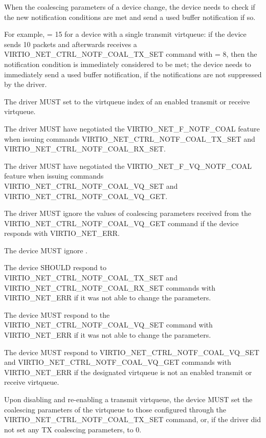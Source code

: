 When the coalescing parameters of a device change, the device needs to check if the new notification conditions are met and send a used buffer notification if so.

For example,  = 15 for a device with a single transmit virtqueue: if the device sends 10 packets and afterwards receives a
VIRTIO_NET_CTRL_NOTF_COAL_TX_SET command with  = 8, then the notification condition is immediately considered to be met;
the device needs to immediately send a used buffer notification, if the notifications are not suppressed by the driver.


The driver MUST set  to the virtqueue index of an enabled transmit or receive virtqueue.

The driver MUST have negotiated the VIRTIO_NET_F_NOTF_COAL feature when issuing commands VIRTIO_NET_CTRL_NOTF_COAL_TX_SET and VIRTIO_NET_CTRL_NOTF_COAL_RX_SET.

The driver MUST have negotiated the VIRTIO_NET_F_VQ_NOTF_COAL feature when issuing commands VIRTIO_NET_CTRL_NOTF_COAL_VQ_SET and VIRTIO_NET_CTRL_NOTF_COAL_VQ_GET.

The driver MUST ignore the values of coalescing parameters received from the VIRTIO_NET_CTRL_NOTF_COAL_VQ_GET command if the device responds with VIRTIO_NET_ERR.


The device MUST ignore .

The device SHOULD respond to VIRTIO_NET_CTRL_NOTF_COAL_TX_SET and VIRTIO_NET_CTRL_NOTF_COAL_RX_SET commands with VIRTIO_NET_ERR if it was not able to change the parameters.

The device MUST respond to the VIRTIO_NET_CTRL_NOTF_COAL_VQ_SET command with VIRTIO_NET_ERR if it was not able to change the parameters.

The device MUST respond to VIRTIO_NET_CTRL_NOTF_COAL_VQ_SET and VIRTIO_NET_CTRL_NOTF_COAL_VQ_GET commands with
VIRTIO_NET_ERR if the designated virtqueue is not an enabled transmit or receive virtqueue.

Upon disabling and re-enabling a transmit virtqueue, the device MUST set the coalescing parameters of the virtqueue
to those configured through the VIRTIO_NET_CTRL_NOTF_COAL_TX_SET command, or, if the driver did not set any TX coalescing parameters, to 0.

